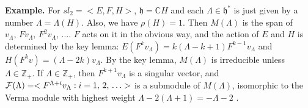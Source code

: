 \documentclass[11pt]{article}
\begin{document}
\textbf{Example.} For $sl_2 = <E, F, H>$, ${\mathfrak h} = \mathbb{C}H$ and each $\Lambda \in {\mathfrak h}^*$ is just given by a number $\Lambda=\Lambda(H)$. Also, we have $\rho(H)=1$. Then $M(\Lambda)$ is the span of $v_\Lambda,\, Fv_\Lambda,\, F^2 v_\Lambda,\, \ldots $. $F$ acts on it in the obvious way, and the action of $E$ and $H$ is determined by the key lemma: $E(F^k v_\Lambda) = k (\Lambda - k + 1)F^{k-1} v_\Lambda$ and $H (F^k v) = (\Lambda - 2k)v_\Lambda$. By the key lemma, $M(\Lambda)$ is irreducible unless $\Lambda \in \mathbb{Z}_+$. If $\Lambda \in \mathbb{Z}_+$, then $F^{k+1} v_\Lambda$ is a singular vector, and ${\cal F}(\Lambda) = < F^{\Lambda + i}v_\Lambda : i=1,\, 2,\, \ldots >$ is a submodule of $M(\Lambda)$, isomorphic to the Verma module with highest weight $\Lambda - 2 (\Lambda + 1) = -\Lambda -2$ .
\end{document}
